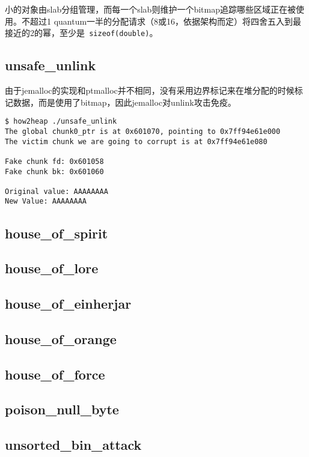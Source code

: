 小的对象由slab分组管理，而每一个slab则维护一个bitmap追踪哪些区域正在被使用。不超过1 quantum一半的分配请求（8或16，依据架构而定）将四舍五入到最接近的2的幂，至少是\verb+ sizeof(double)+。

\subsection{unsafe\_unlink}

由于jemalloc的实现和ptmalloc并不相同，没有采用边界标记来在堆分配的时候标记数据，而是使用了bitmap，因此jemalloc对unlink攻击免疫。
\begin{verbatim}
$ how2heap ./unsafe_unlink
The global chunk0_ptr is at 0x601070, pointing to 0x7ff94e61e000
The victim chunk we are going to corrupt is at 0x7ff94e61e080

Fake chunk fd: 0x601058
Fake chunk bk: 0x601060

Original value: AAAAAAAA
New Value: AAAAAAAA

\end{verbatim}

\subsection{house\_of\_spirit}

\subsection{house\_of\_lore}

\subsection{house\_of\_einherjar}

\subsection{house\_of\_orange}

\subsection{house\_of\_force}

\subsection{poison\_null\_byte}

\subsection{unsorted\_bin\_attack}

